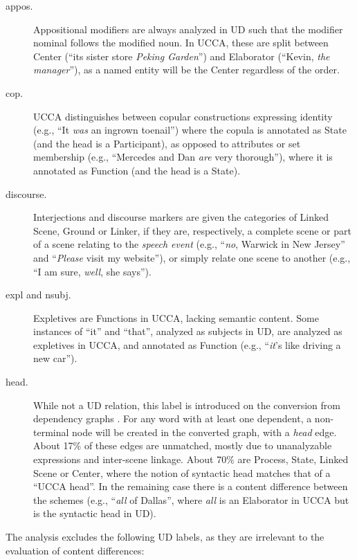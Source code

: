 \documentclass[11pt,a4paper]{article}
\begin{document}
\begin{description}
    \item[appos.]
    Appositional modifiers are always analyzed in UD such that
    the modifier nominal follows the modified noun.
    In UCCA, these are split between Center
    (``its sister store \textit{Peking Garden}'')
    and Elaborator (``Kevin, \textit{the manager}''),
    as a named entity will be the Center regardless of the order.
    \item[cop.]
    UCCA distinguishes between copular constructions expressing
    identity (e.g., ``It \textit{was} an ingrown toenail'') where the copula is annotated as State
    (and the head is a Participant),
    as opposed to attributes or set membership
    (e.g., ``Mercedes and Dan \textit{are} very thorough''), where it is annotated as Function
    (and the head is a State).    
    \item[discourse.]
    Interjections and discourse markers are given the categories of
    Linked Scene, Ground or Linker,
    if they are, respectively, a complete scene or part of a scene relating to the \textit{speech event}
    (e.g., ``\textit{no}, Warwick in New Jersey'' and
    ``\textit{Please} visit my website''),
    or simply relate one scene to another
    (e.g., ``I am sure, \textit{well}, she says'').
    \item[expl and nsubj.]
    Expletives are Functions in UCCA, lacking semantic content.
    Some instances of ``it'' and ``that'', analyzed as subjects in UD,
    are analyzed as expletives in UCCA, and annotated as Function
    (e.g., ``\textit{it}'s like driving a new car'').    
    \item[head.]
    While not a UD relation, this label is introduced on the conversion from dependency graphs
    \cite{hershcovich2018multitask}.
    For any word with at least one dependent,
    a non-terminal node will be created in the converted graph, with a \textit{head} edge.
    About 17\% of these edges are unmatched, mostly due to unanalyzable expressions and inter-scene linkage.
    About 70\% are Process, State, Linked Scene or Center,
    where the notion of syntactic head matches that of a ``UCCA head''.
    In the remaining case there is a content difference between the schemes
    (e.g., ``\textit{all} of Dallas'', where \textit{all} is an Elaborator
    in UCCA but is the syntactic head in UD).
\end{description}

The analysis excludes the following UD labels,
as they are irrelevant to the evaluation of content differences:
\end{document}
